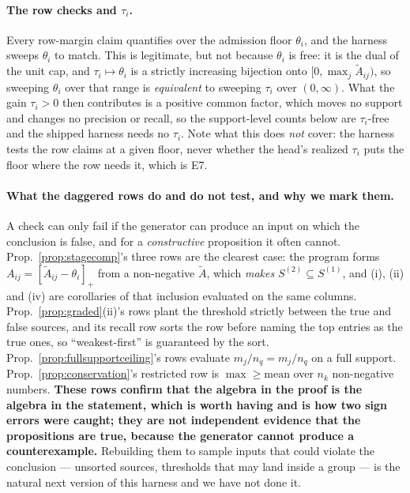 \documentclass{article}
\begin{document}
\paragraph{The row checks and $\tau_i$.} Every row-margin claim quantifies over the admission
floor $\theta_i$, and the harness sweeps $\theta_i$ to match. This is legitimate, but not because
$\theta_i$ is free: it is the dual of the unit cap, and $\tau_i\mapsto\theta_i$ is a strictly
increasing bijection onto $[0,\max_j\tilde A_{ij})$, so sweeping $\theta_i$ over that range is
\emph{equivalent} to sweeping $\tau_i$ over $(0,\infty)$. What the gain $\tau_i>0$ then
contributes is a positive common factor, which moves no support and changes no precision or
recall, so the support-level counts below are $\tau_i$-free and the shipped harness needs no
$\tau_i$. Note what this does \emph{not} cover: the harness tests the row claims at a given
floor, never whether the head's realized $\tau_i$ puts the floor where the row needs it, which is
E7.

\paragraph{What the daggered rows do and do not test, and why we mark them.} A check can only
fail if the generator can produce an input on which the conclusion is false, and for a
\emph{constructive} proposition it often cannot. Prop.~\ref{prop:stagecomp}'s three rows are the
clearest case: the program forms $A_{ij}=[\tilde A_{ij}-\theta_i]_+$ from a non-negative
$\tilde A$, which \emph{makes} $S^{(2)}\subseteq S^{(1)}$, and (i), (ii) and (iv) are corollaries
of that inclusion evaluated on the same columns. Prop.~\ref{prop:graded}(ii)'s rows plant the
threshold strictly between the true and false sources, and its recall row sorts the row before
naming the top entries as the true ones, so ``weakest-first'' is guaranteed by the sort.
Prop.~\ref{prop:fullsupportceiling}'s rows evaluate $m_j/n_q = m_j/n_q$ on a full support.
Prop.~\ref{prop:conservation}'s restricted row is $\max\ge\mathrm{mean}$ over $n_k$ non-negative
numbers. \textbf{These rows confirm that the algebra in the proof is the algebra in the
statement, which is worth having and is how two sign errors were caught; they are not independent
evidence that the propositions are true, because the generator cannot produce a counterexample.}
Rebuilding them to sample inputs that could violate the conclusion --- unsorted sources, thresholds
that may land inside a group --- is the natural next version of this harness and we have not done
it.
\end{document}
